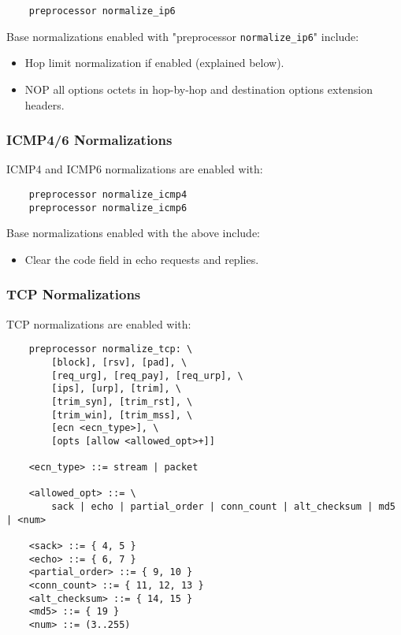 \documentclass[english]{report}
\begin{document}
\begin{verbatim}
    preprocessor normalize_ip6
\end{verbatim}

Base normalizations enabled with "preprocessor \texttt{normalize\_ip6}" include:

\begin{itemize} 
\item
Hop limit normalization if enabled (explained below).

\item
NOP all options octets in hop-by-hop and destination options extension headers.
\end{itemize} 


\subsubsection{ICMP4/6 Normalizations}

ICMP4 and ICMP6 normalizations are enabled with:

\begin{verbatim}
    preprocessor normalize_icmp4
    preprocessor normalize_icmp6
\end{verbatim}

Base normalizations enabled with the above include:

\begin{itemize} 
\item
Clear the code field in echo requests and replies.
\end{itemize} 


\subsubsection{TCP Normalizations}

TCP normalizations are enabled with:

\begin{verbatim}
    preprocessor normalize_tcp: \
        [block], [rsv], [pad], \
        [req_urg], [req_pay], [req_urp], \
        [ips], [urp], [trim], \
        [trim_syn], [trim_rst], \
        [trim_win], [trim_mss], \
        [ecn <ecn_type>], \
        [opts [allow <allowed_opt>+]]

    <ecn_type> ::= stream | packet

    <allowed_opt> ::= \
        sack | echo | partial_order | conn_count | alt_checksum | md5 | <num>

    <sack> ::= { 4, 5 }
    <echo> ::= { 6, 7 }
    <partial_order> ::= { 9, 10 }
    <conn_count> ::= { 11, 12, 13 }
    <alt_checksum> ::= { 14, 15 }
    <md5> ::= { 19 }
    <num> ::= (3..255) 
\end{verbatim}
\end{document}
